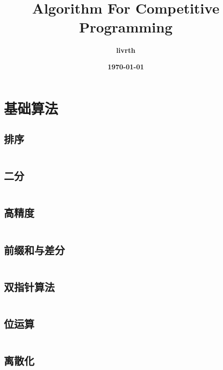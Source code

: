 \documentclass[a4paper,10pt]{article}
\author{\textbf{livrth}}
\title{\textbf{Algorithm For Competitive Programming}}
\date{\textbf{\today}}
\begin{document}
\maketitle %
\setcounter{page}{0}
\thispagestyle{empty} %
\newpage %
\tableofcontents %


\newpage
\section{基础算法}
\subsection{排序}
\inputminted[breaklines, linenos]{c++}{basic/sort.cc}
\subsection{二分}
\inputminted[breaklines, linenos]{c++}{basic/binary_search.cc}
\subsection{高精度}
\inputminted[breaklines, linenos]{c++}{basic/high_precision.cc}
\subsection{前缀和与差分}
\inputminted[breaklines, linenos]{c++}{basic/prefixsum_diff.cc}
\subsection{双指针算法}
\inputminted[breaklines, linenos]{c++}{basic/double_pointer.cc}
\subsection{位运算}
\inputminted[breaklines, linenos]{c++}{basic/bit.cc}
\subsection{离散化}
\inputminted[breaklines, linenos]{c++}{basic/disc.cc}
\end{document}
